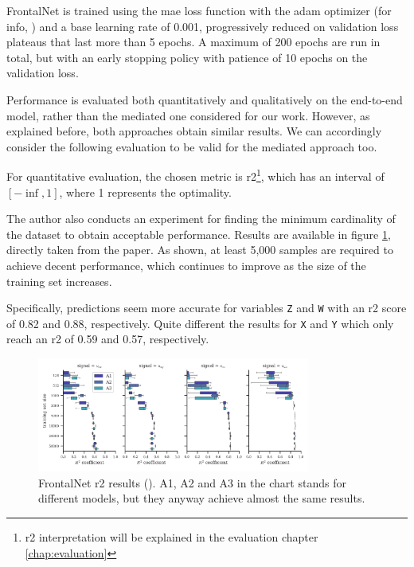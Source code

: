 FrontalNet is trained using the \gls{mae} loss function with the \gls{adam} optimizer (for info, \cite{kingma2014adam}) and a base learning rate of 0.001, progressively reduced on validation loss plateaus that last more than 5 epochs. A maximum of 200 epochs are run in total, but with an early stopping policy with patience of 10 epochs on the validation loss. 

Performance is evaluated both quantitatively and qualitatively on the end-to-end model, rather than the mediated one considered for our work. However, as explained before, both approaches obtain similar results. We can accordingly consider the following evaluation to be valid for the mediated approach too.

\medskip 

For quantitative evaluation, the chosen metric is \gls{r2}\footnote{\gls{r2} interpretation will be explained in the evaluation chapter \ref{chap:evaluation}}, which has an interval of $[-\inf, 1]$, where 1 represents the optimality. 

The author also conducts an experiment for finding the minimum cardinality of the dataset to obtain acceptable performance. Results are available in figure \ref{fig:frontalnet-r2}, directly taken from the paper. As shown, at least 5,000 samples are required to achieve decent performance, which continues to improve as the size of the training set increases.

Specifically, predictions seem more accurate for variables \texttt{Z} and \texttt{W} with an \gls{r2} score of 0.82 and 0.88, respectively. Quite different the results for \texttt{X} and \texttt{Y} which only reach an \gls{r2} of 0.59 and 0.57, respectively.

\begin{figure}[!htb]
	\centering
	\includegraphics[width=0.8\textwidth]{"contents/images/03-frontalnet-r2"}
	\caption[FrontalNet \gls{r2} results (\cite{mantegazza2019visionbased})]{FrontalNet \gls{r2} results (\cite{mantegazza2019visionbased}). A1, A2 and A3 in the chart stands for different models, but they anyway achieve almost the same results.}
	\label{fig:frontalnet-r2}
\end{figure}

